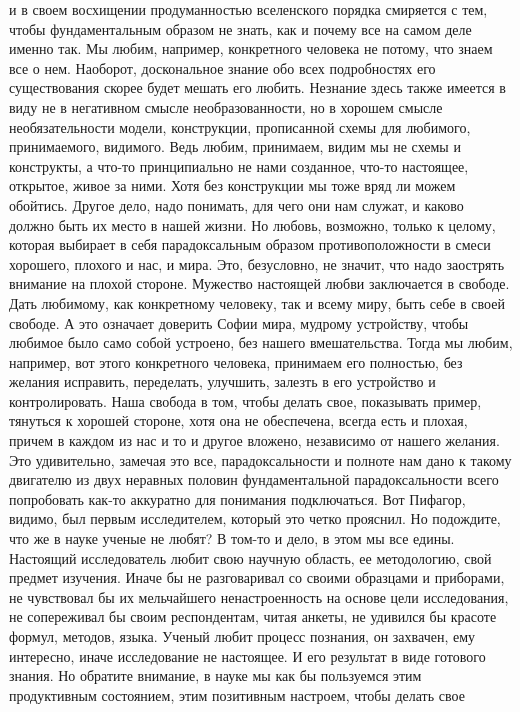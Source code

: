 и в своем восхищении продуманностью вселенского порядка смиряется с тем, чтобы
фундаментальным образом не знать, как и почему все на самом деле именно так. Мы
любим, например, конкретного человека не потому, что знаем все о нем. Наоборот,
доскональное знание обо всех подробностях его существования скорее будет мешать
его любить. Незнание здесь также имеется в виду не в негативном смысле
необразованности, но в хорошем смысле необязательности модели, конструкции,
прописанной схемы для любимого, принимаемого, видимого. Ведь любим, принимаем,
видим мы не схемы и конструкты, а что-то принципиально не нами созданное, что-то
настоящее, открытое, живое за ними. Хотя без конструкции мы тоже вряд ли можем
обойтись. Другое дело, надо понимать, для чего они нам служат, и каково должно
быть их место в нашей жизни. Но любовь, возможно, только к целому, которая
выбирает в себя парадоксальным образом противоположности в смеси хорошего,
плохого и нас, и мира. Это, безусловно, не значит, что надо заострять внимание
на плохой стороне. Мужество настоящей любви заключается в свободе. Дать
любимому, как конкретному человеку, так и всему миру, быть себе в своей свободе.
А это означает доверить Софии мира, мудрому устройству, чтобы любимое было само
собой устроено, без нашего вмешательства. Тогда мы любим, например, вот этого
конкретного человека, принимаем его полностью, без желания исправить,
переделать, улучшить, залезть в его устройство и контролировать. Наша свобода в
том, чтобы делать свое, показывать пример, тянуться к хорошей стороне, хотя она
не обеспечена, всегда есть и плохая, причем в каждом из нас и то и другое
вложено, независимо от нашего желания. Это удивительно, замечая это все,
парадоксальности и полноте нам дано к такому двигателю из двух неравных половин
фундаментальной парадоксальности всего попробовать как-то аккуратно для
понимания подключаться. Вот Пифагор, видимо, был первым исследителем, который
это четко прояснил. Но подождите, что же в науке ученые не любят? В том-то и
дело, в этом мы все едины. Настоящий исследователь любит свою научную область,
ее методологию, свой предмет изучения. Иначе бы не разговаривал со своими
образцами и приборами, не чувствовал бы их мельчайшего ненастроенность на основе
цели исследования, не сопереживал бы своим респондентам, читая анкеты, не
удивился бы красоте формул, методов, языка. Ученый любит процесс познания, он
захвачен, ему интересно, иначе исследование не настоящее. И его результат в виде
готового знания. Но обратите внимание, в науке мы как бы пользуемся этим
продуктивным состоянием, этим позитивным настроем, чтобы делать свое
